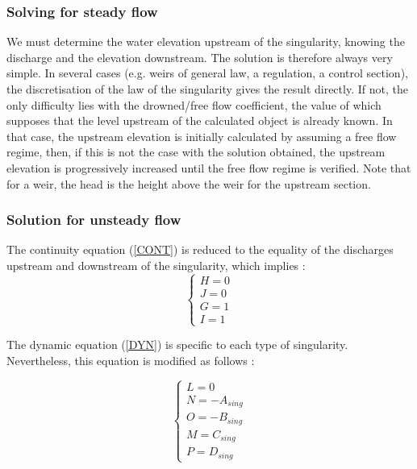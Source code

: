 \subsubsection{Solving for steady flow}

We must determine the water elevation upstream of the singularity, knowing the discharge and the elevation downstream. The solution is therefore always very simple. In several cases (e.g. weirs of general law, a regulation, a control section), the discretisation of the law of the singularity gives the result directly. If not, the only difficulty lies with the drowned/free flow coefficient, the value of which supposes that the level upstream of the calculated object is already known.
In that case, the upstream elevation is initially calculated by assuming a free flow regime, then, if this is not the case with the solution obtained, the upstream elevation is progressively increased until the free flow regime is verified. Note that for a weir, the head is the height above the weir for the upstream section.

\subsubsection{Solution for unsteady flow}

The continuity equation (\ref{CONT}) is reduced to the equality of the discharges upstream and downstream of the singularity, which implies :
\begin{equation}
  \left \lbrace
     \begin{array}{l}
      H = 0\\
      J = 0\\
      G = 1\\
      I = 1
     \end{array}
    \right.
\end{equation}

The dynamic equation (\ref{DYN}) is specific to each type of singularity.  Nevertheless, this equation is modified as follows :

\begin{equation}
  \left \lbrace
     \begin{array}{l}
      L = 0\\
      N = -A_{sing}\\
      O = -B_{sing}\\
      M = C_{sing}\\
      P = D_{sing}
     \end{array}
    \right.
\end{equation}

